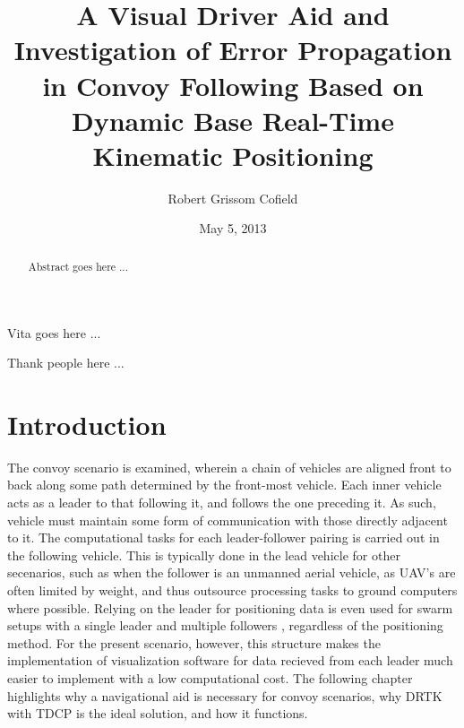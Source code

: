 \documentclass[12pt]{report}
\title{A Visual Driver Aid and Investigation of Error Propagation in Convoy Following Based on Dynamic Base Real-Time Kinematic Positioning}
\author{Robert Grissom Cofield}
\date{May 5, 2013}
\begin{document}

\begin{romanpages}

\ApprovalPage
\TitlePage
\CopyrightPage

\begin{vita}%
Vita goes here ...
\end{vita}


\begin{abstract}
Abstract goes here ...
\end{abstract}


\begin{acknowledgments}
Thank people here ...
\end{acknowledgments}


\software{\LaTeX}
\StylePage

\tableofcontents
\listoffigures
\listoftables

\printnomenclature[0.75in] 

\end{romanpages}

\normalem       %


\chapter{Introduction}

The convoy scenario is examined, wherein a chain of vehicles are aligned front to back along some path determined by the front-most vehicle. Each inner vehicle acts as a leader to that following it, and follows the one preceding it. As such, vehicle must maintain some form of communication with those directly adjacent to it.
The computational tasks for each leader-follower pairing is carried out in the following vehicle. This is typically done in the lead vehicle for other secenarios, such as when the follower is an unmanned aerial vehicle, as UAV's are often limited by weight, and thus outsource processing tasks to ground computers where possible. Relying on the leader for positioning data is even used for swarm setups with a single leader and multiple followers \cite{gian}, regardless of the positioning method. For the present scenario, however, this structure makes the implementation of visualization software for data recieved from each leader much easier to implement with a low computational cost. The following chapter highlights why a navigational aid is necessary for convoy scenarios, why DRTK with TDCP is the ideal solution, and how it functions.
\end{document}
